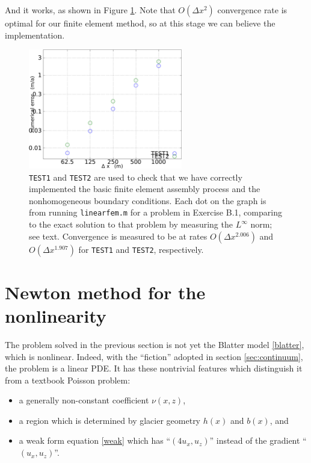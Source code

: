 \documentclass[11pt,final,reqno]{amsart}
\theoremstyle{remark}
\theoremstyle{definition}
\newcommand{\TESTONE}{\texttt{TEST1}\xspace}
\newcommand{\TESTTWO}{\texttt{TEST2}\xspace}
\begin{document}
And it works, as shown in Figure \ref{fig:linearverify}.  Note that $O(\Delta x^2)$ convergence rate is optimal for our finite element method, so at this stage we can believe the implementation.

\begin{figure}[ht] 
\includegraphics[width=0.6\textwidth]{figs/linearverify}
\caption{\TESTONE and \TESTTWO are used to check that we have correctly implemented the basic finite element assembly process and the nonhomogeneous boundary conditions.  Each dot on the graph is from running \texttt{linearfem.m} for a problem in Exercise B.1, comparing to the exact solution to that problem by measuring the $L^\infty$ norm; see text.  Convergence is measured to be at rates $O(\Delta x^{2.006})$ and $O(\Delta x^{1.907})$ for \TESTONE and \TESTTWO, respectively.}
\label{fig:linearverify}
\end{figure}


\clearpage
\newpage
\section{Newton method for the nonlinearity}\label{sec:nonlinear}  The problem solved in the previous section is not yet the Blatter model \eqref{blatter}, which is nonlinear.  Indeed, with the ``fiction'' adopted in section \ref{sec:continuum}, the problem is a linear PDE.  It has these nontrivial features which distinguish it from a textbook Poisson problem:
\begin{itemize}
\item a generally non-constant coefficient $\nu(x,z)$,
\item a region which is determined by glacier geometry $h(x)$ and $b(x)$, and
\item a weak form equation \eqref{weak} which has ``$(4u_x,u_z)$'' instead of the gradient ``$(u_x,u_z)$''.
\end{itemize}
\end{document}
